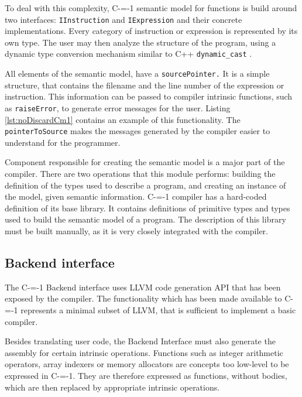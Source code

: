 To deal with this complexity, C-=-1 semantic model for functions is build around two interfaces: \lstinline{IInstruction} and \lstinline{IExpression} and their concrete implementations.
Every category of instruction or expression is represented by its own type.
The user may then analyze the structure of the program, using a dynamic type conversion mechanism similar to C++ \lstinline{dynamic_cast} \cite{ISO:cpp98}.

All elements of the semantic model, have a \lstinline{sourcePointer.}
It is a simple structure, that contains the filename and the line number of the expression or instruction.
This information can be passed to compiler intrinsic functions, such as \lstinline{raiseError}, to generate error messages for the user.
Listing \ref{lst:noDiscardCm1} contains an example of this functionality.
The \lstinline{pointerToSource} makes the messages generated by the compiler easier to understand for the programmer.

Component responsible for creating the semantic model is a major part of the compiler.
There are two operations that this module performs: building the definition of the types used to describe a program, and creating an instance of the model, given semantic information.
C-=-1 compiler has a hard-coded definition of its base library.
It contains definitions of primitive types and types used to build the semantic model of a program.
The description of this library must be built manually, as it is very closely integrated with the compiler.

\subsection{Backend interface}
\label{implementation/Backend-interface}

The C-=-1 Backend interface uses LLVM \cite{llvmir} code generation API that has been exposed by the compiler.
The functionality which has been made available to C-=-1 represents a minimal subset of LLVM, that is sufficient to implement a basic compiler.




Besides translating user code, the Backend Interface must also generate the assembly for certain intrinsic operations.
Functions such as integer arithmetic operators, array indexers or memory allocators are concepts too low-level to be expressed in C-=-1.
They are therefore expressed as functions, without bodies, which are then replaced by appropriate intrinsic operations.

